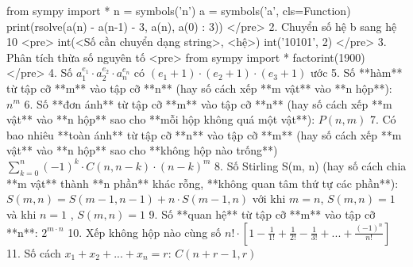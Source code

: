     from sympy import *
    n = symbols('n')
    a = symbols('a', cls=Function)
    print(rsolve(a(n) - a(n-1) - 3, a(n), {a(0) : 3}))
    </pre>
2. Chuyển số hệ b sang hệ 10
    <pre>
        int(<Số cần chuyển dạng string>, <hệ>)
        int('10101', 2)
    </pre>
3. Phân tích thừa số nguyên tố
    <pre>
        from sympy import *
        factorint(1900)
    </pre>
4. Số $a_1^{e_1}\cdot a_2^{e_2}\cdot a_n^{e_n}$ có $(e_1+1)\cdot(e_2+1)\cdot(e_3+1)$ ước
5. Số **hàm** từ tập cỡ **m** vào tập cỡ **n** (hay số cách xếp **m vật** vào **n hộp**): $n^m$
6. Số **đơn ánh** từ tập cỡ **m** vào tập cỡ **n** (hay số cách xếp **m vật** vào **n hộp** sao cho **mỗi hộp không quá một vật**): $P(n,m)$
7. Có bao nhiêu **toàn ánh** từ tập cỡ **n** vào tập cỡ **m** (hay số cách xếp **m vật** vào **n hộp** sao cho **không hộp nào trống**)
$\displaystyle \sum_{k=0}^n(-1)^k\cdot C(n, n-k)\cdot (n-k)^m$
8. Số Stirling S(m, n)  (hay số cách chia **m vật** thành **n phần** khác rỗng, **không quan tâm thứ tự các phần**): $S(m, n) = S(m-1, n-1) + n \cdot S(m-1, n)$ với khi $m=n$, $S(m,n)=1$ và khi $n=1$ , $S(m,n)=1$
9. Số **quan hệ** từ tập cỡ **m** vào tập cỡ **n**: $2^{m\cdot n}$
10. Xếp không hộp nào cùng số
$n!\cdot [1-\frac{1}{1!} + \frac{1}{2!}-\frac{1}{3!}+...+\frac{(-1)^n}{n!}]$
11. Số cách $x_1+x_2+...+x_n = r$: $C(n+r-1, r)$
